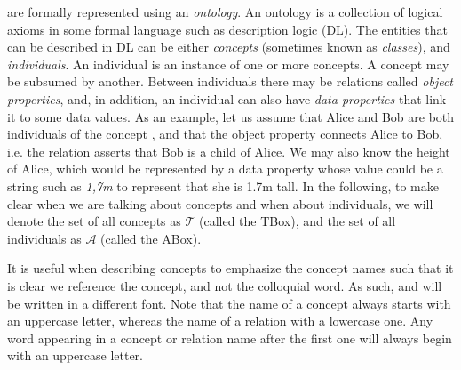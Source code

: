 \neems are formally represented using an \emph{ontology}.
An ontology is a collection of logical axioms in some formal language such as description logic (DL).
The entities that can be described in DL can be either \emph{concepts} (sometimes known as \emph{classes}),
and  \emph{individuals}.
An individual is an instance of one or more concepts.
A concept may be subsumed by another.
Between individuals there may be relations called \emph{object properties},
and, in addition, an individual can also have \emph{data properties} that link it to some data values.
As an example, let us assume that Alice and Bob are both individuals of the concept ,
and that the object property  connects Alice to Bob,
i.e. the relation asserts that Bob is a child of Alice.
We may also know the height of Alice, which would be represented by a data property  whose value could be a string such as \emph{1,7m} to represent that she is 1.7m tall.
In the following, to make clear when we are talking about concepts and when about individuals, we will denote the set of all concepts as $\mathcal{T}$ (called the TBox), and the set of all individuals as $\mathcal{A}$ (called the ABox).

It is useful when describing concepts to emphasize the concept names such that it is clear we reference the concept, and not the colloquial word. As such,  and  will be written in a different font.
Note that the name of a concept always starts with an uppercase letter, whereas the name of a relation with a lowercase one.
Any word appearing in a concept or relation name after the first one will always begin with an uppercase letter.


